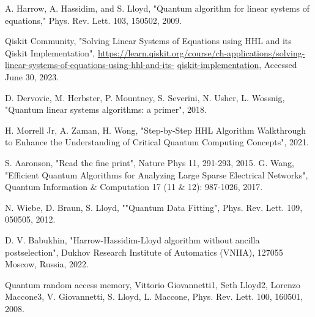 \begin{thebibliography}{00}

A. Harrow, A. Hassidim, and S. Lloyd, 
"Quantum algorithm for linear systems of equations," 
Phys. Rev. Lett. 103, 150502, 
2009.

 Qiskit Community,  
"Solving Linear Systems of Equations using HHL and its Qiskit Implementation", 
\url{https://learn.qiskit.org/course/ch-applications}\url{/solving-linear-systems-of-equations-}\url{using-hhl-and-its-}
\url{qiskit-implementation},  
Accessed June 30, 
2023.

D. Dervovic, M. Herbster, P. Mountney, S. Severini, N. Usher, L. Wossnig, 
"Quantum linear systems algorithms: a primer", 
2018.


H. Morrell Jr, A. Zaman, H. Wong, 
"Step-by-Step HHL Algorithm Walkthrough to Enhance the Understanding of Critical Quantum Computing Concepts", 
2021.

S. Aaronson, 
"Read the fine print",  
Nature Phys 11, 291-293, 
2015.
G. Wang, 
"Efficient Quantum Algorithms for Analyzing Large Sparse Electrical Networks",
Quantum Information \& Computation 17 (11 \& 12): 987-1026, 
2017. 

N. Wiebe, D. Braun, S. Lloyd, 
""Quantum Data Fitting", 
Phys. Rev. Lett. 109, 050505, 
2012.

D. V. Babukhin, 
"Harrow-Hassidim-Lloyd algorithm without ancilla postselection",
Dukhov Research Institute of Automatics (VNIIA), 127055 Moscow, Russia,
2022.


Quantum random access memory,
Vittorio Giovannetti1, Seth Lloyd2, Lorenzo Maccone3,
V. Giovannetti, S. Lloyd, L. Maccone, Phys. Rev. Lett. 100, 160501,
2008.



\end{thebibliography}



\begin{comment}
- Qram

it-sec:
- larg scale linear systems
- pattern recognitionj

    HHL-2009: 
    step by step: 
    primer: https://arxiv.org/abs/1802.08227
    exponential imprved dependencs on precision: https://arxiv.org/abs/1511.02306
    without ancilla: https://arxiv.org/abs/2208.02200
    data fitting:
    fineprint: https://inspirehep.net/literature/1834407
    large electrical networks: https://arxiv.org/abs/1311.1851
    qiskit example: https://learn.qiskit.org/course/ch-applications/solving-linear-systems-of-equations-using-hhl-and-its-qiskit-implementation#example1


    QPE: https://arxiv.org/abs/quant-ph/9511026
\end{comment}
